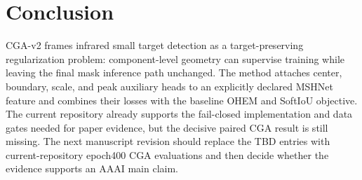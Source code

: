 \documentclass[letterpaper]{article}
\begin{document}
\section{Conclusion}

CGA-v2 frames infrared small target detection as a target-preserving regularization problem: component-level geometry can supervise training while leaving the final mask inference path unchanged. The method attaches center, boundary, scale, and peak auxiliary heads to an explicitly declared MSHNet feature and combines their losses with the baseline OHEM and SoftIoU objective. The current repository already supports the fail-closed implementation and data gates needed for paper evidence, but the decisive paired CGA result is still missing. The next manuscript revision should replace the TBD entries with current-repository epoch400 CGA evaluations and then decide whether the evidence supports an AAAI main claim.


\end{document}
